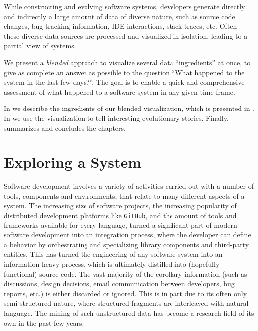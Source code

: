 



While constructing and evolving software systems, developers generate directly and indirectly a large amount of data of diverse nature, such as source code changes, bug tracking information, IDE interactions, stack traces, etc.
Often these diverse data sources are processed and visualized in isolation, leading to a partial view of systems.

We present a \emph{blended} approach to visualize several data ``ingredients'' at once, to give as complete an answer as possible to the question {``What happened to the system in the last few days?''}.
The goal is to enable a quick and comprehensive assessment of what happened to a software system in any given time frame.

\structure

In  we describe the ingredients of our blended visualization, which is presented in .
In  we use the visualization to tell interesting evolutionary stories.
Finally,  summarizes and concludes the chapters.

\newpage


\section{Exploring a System} \label{sec:blend-intro}

Software development involves a variety of activities carried out with a number of tools, components and environments, that relate to many different aspects of a system.
The increasing size of software projects, the increasing popularity of distributed development platforms like \texttt{GitHub}, and the amount of tools and frameworks available for every language, turned a significant part of modern software development into an integration process, where the developer can define a behavior by orchestrating and specializing library components and third-party entities.
This has turned the engineering of any software system into an information-heavy process, which is ultimately distilled into (hopefully functional) source code.
The vast majority of the corollary information (such as discussions, design decisions, email communication between developers, bug reports, etc.) is either discarded or ignored.
This is in part due to its often only semi-structured nature, where structured fragments are interleaved with natural language.
The mining of such unstructured data has become a research field of its own in the past few years.

